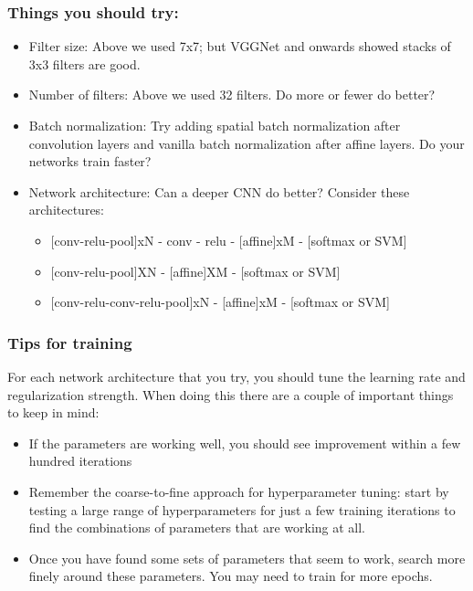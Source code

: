 \documentclass[11pt]{article}
\providecommand{\tightlist}{%
      \setlength{\itemsep}{0pt}\setlength{\parskip}{0pt}}
\begin{document}
\hypertarget{things-you-should-try}{%
\subsubsection{Things you should try:}\label{things-you-should-try}}

\begin{itemize}
\tightlist
\item
  Filter size: Above we used 7x7; but VGGNet and onwards showed stacks
  of 3x3 filters are good.\\
\item
  Number of filters: Above we used 32 filters. Do more or fewer do
  better?
\item
  Batch normalization: Try adding spatial batch normalization after
  convolution layers and vanilla batch normalization after affine
  layers. Do your networks train faster?
\item
  Network architecture: Can a deeper CNN do better? Consider these
  architectures:

  \begin{itemize}
  \tightlist
  \item
    {[}conv-relu-pool{]}xN - conv - relu - {[}affine{]}xM - {[}softmax
    or SVM{]}
  \item
    {[}conv-relu-pool{]}XN - {[}affine{]}XM - {[}softmax or SVM{]}
  \item
    {[}conv-relu-conv-relu-pool{]}xN - {[}affine{]}xM - {[}softmax or
    SVM{]}
  \end{itemize}
\end{itemize}

\hypertarget{tips-for-training}{%
\subsubsection{Tips for training}\label{tips-for-training}}

For each network architecture that you try, you should tune the learning
rate and regularization strength. When doing this there are a couple of
important things to keep in mind:

\begin{itemize}
\tightlist
\item
  If the parameters are working well, you should see improvement within
  a few hundred iterations
\item
  Remember the coarse-to-fine approach for hyperparameter tuning: start
  by testing a large range of hyperparameters for just a few training
  iterations to find the combinations of parameters that are working at
  all.
\item
  Once you have found some sets of parameters that seem to work, search
  more finely around these parameters. You may need to train for more
  epochs.
\end{itemize}
\end{document}
